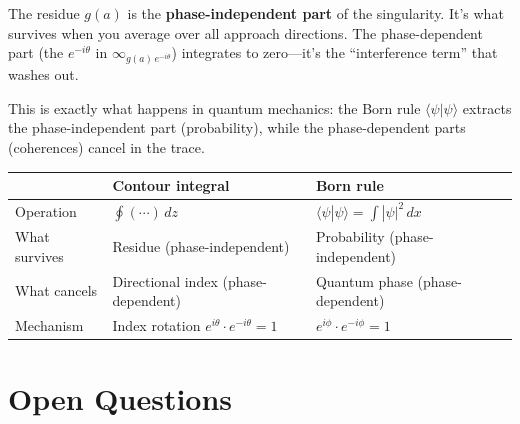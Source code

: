 \documentclass[11pt,a4paper]{article}
\newcommand{\vinf}[1]{\infty_{#1}}   %
\begin{document}
The residue $g(a)$ is the \textbf{phase-independent part} of the singularity. It's what survives when you average over all approach directions. The phase-dependent part (the $e^{-i\theta}$ in $\vinf{g(a)\,e^{-i\theta}}$) integrates to zero---it's the ``interference term'' that washes out.

This is exactly what happens in quantum mechanics: the Born rule $\langle\psi|\psi\rangle$ extracts the phase-independent part (probability), while the phase-dependent parts (coherences) cancel in the trace.

\begin{center}
\renewcommand{\arraystretch}{1.4}
\begin{tabular}{lll}
& \textbf{Contour integral} & \textbf{Born rule} \\
\hline
Operation & $\oint (\cdots)\,dz$ & $\langle\psi|\psi\rangle = \int |\psi|^2\,dx$ \\
What survives & Residue (phase-independent) & Probability (phase-independent) \\
What cancels & Directional index (phase-dependent) & Quantum phase (phase-dependent) \\
Mechanism & Index rotation $e^{i\theta} \cdot e^{-i\theta} = 1$ & $e^{i\phi} \cdot e^{-i\phi} = 1$ \\
\end{tabular}
\end{center}

\section{Open Questions}
\end{document}
